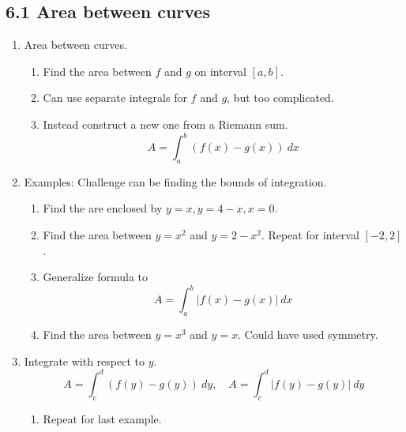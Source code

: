 \documentclass{article}
\begin{document}
\subsection{6.1 Area between curves}
\begin{enumerate}

\item Area between curves.
\begin{enumerate}
\item Find the area between $f$ and $g$ on interval $[a,b]$. 
\item Can use separate integrals for $f$ and $g$, but too complicated. 
\item Instead construct a new one from a Riemann sum.
\[
A = \int_a^b (f(x)-g(x))~ dx
\]
\end{enumerate}

\item Examples: Challenge can be finding the bounds of integration.
\begin{enumerate}
\item Find the are enclosed by $y = x, y = 4-x, x = 0$.
\item Find the area between $y = x^2$ and $y = 2-x^2$. Repeat for interval $[-2,2]$. 
\item Generalize formula to
\[
A = \int_a^b |f(x)-g(x)|~dx
\]
\item Find the area between $y = x^3$ and $y=x$. Could have used symmetry.
\end{enumerate}

\item Integrate with respect to $y$.
\[
A = \int_c^d (f(y)-g(y)) ~dy, \quad A = \int_c^d |f(y)-g(y)| ~dy
\]
\begin{enumerate}
\item Repeat for last example. 
\end{enumerate}
\end{enumerate}

\end{document}

